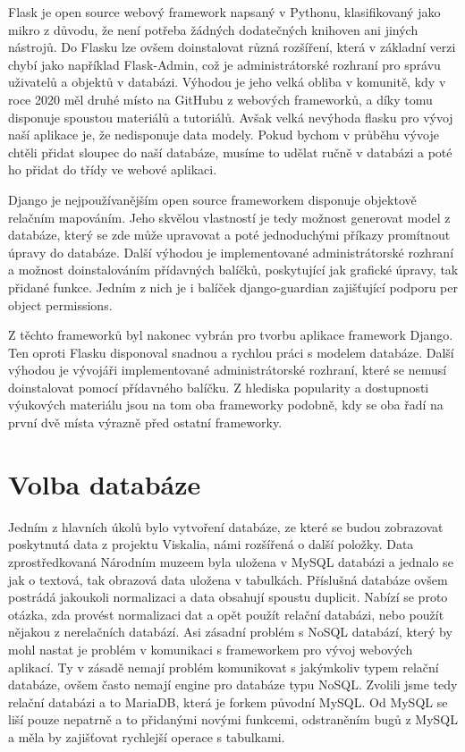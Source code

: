 Flask je open source webový framework napsaný v Pythonu, klasifikovaný
jako mikro z důvodu, že není potřeba žádných dodatečných knihoven ani
jiných nástrojů. Do Flasku lze ovšem doinstalovat různá rozšíření,
která v základní verzi chybí jako například Flask-Admin, což je
administrátorské rozhraní pro správu uživatelů a objektů v
databázi. Výhodou je jeho velká obliba v komunitě, kdy v roce 2020 měl
druhé místo na GitHubu z webových frameworků, a díky tomu disponuje
spoustou materiálů a tutoriálů. Avšak velká nevýhoda flasku pro vývoj
naší aplikace je, že nedisponuje data modely. Pokud bychom v průběhu
vývoje chtěli přidat sloupec do naší databáze, musíme to udělat ručně
v databázi a poté ho přidat do třídy ve webové aplikaci.

Django je nejpoužívanějším open source frameworkem disponuje objektově
relačním mapováním. Jeho skvělou vlastností je tedy možnost generovat
model z databáze, který se zde může upravovat a poté jednoduchými
příkazy promítnout úpravy do databáze. Další výhodou je implementované
administrátorské rozhraní a možnost doinstalováním přídavných balíčků,
poskytující jak grafické úpravy, tak přidané funkce. Jedním z nich je
i balíček django-guardian zajišťující podporu per object permissions.


Z těchto frameworků byl nakonec vybrán pro tvorbu aplikace framework
Django. Ten oproti Flasku disponoval snadnou a rychlou práci s modelem
databáze. Další výhodou je vývojáři implementované administrátorské
rozhraní, které se nemusí doinstalovat pomocí přídavného balíčku. Z
hlediska popularity a dostupnosti výukových materiálu jsou na tom oba
frameworky podobně, kdy se oba řadí na první dvě místa výrazně před
ostatní frameworky.

\vspace{10px}

\section{Volba databáze}

Jedním z hlavních úkolů bylo vytvoření databáze, ze které se budou
zobrazovat poskytnutá data z projektu Viskalia, námi rozšířená o další
položky. Data zprostředkovaná Národním muzeem byla uložena v MySQL
databázi a jednalo se jak o textová, tak obrazová data uložena v
tabulkách. Příslušná databáze ovšem postrádá jakoukoli normalizaci a
data obsahují spoustu duplicit. Nabízí se proto otázka, zda provést
normalizaci dat a opět použít relační databázi, nebo použít nějakou z
nerelačních databází. Asi zásadní problém s NoSQL databází, který by
mohl nastat je problém v komunikaci s frameworkem pro vývoj webových
aplikací. Ty v zásadě nemají problém komunikovat s jakýmkoliv typem
relační databáze, ovšem často nemají engine pro databáze typu
NoSQL. Zvolili jsme tedy relační databázi a to MariaDB, která je
forkem původní MySQL. Od MySQL se liší pouze nepatrně a to přidanými
novými funkcemi, odstraněním bugů z MySQL a měla by zajišťovat
rychlejší operace s tabulkami.


